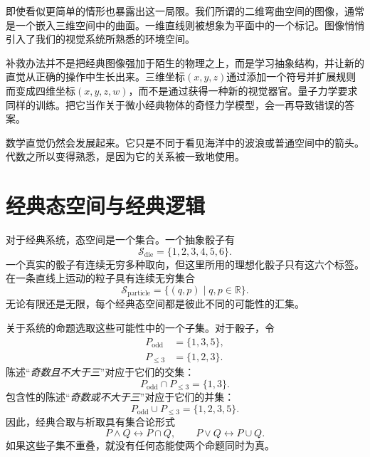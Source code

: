 即使看似更简单的情形也暴露出这一局限。我们所谓的二维弯曲空间的图像，通常是一个嵌入三维空间中的曲面。一维直线则被想象为平面中的一个标记。图像悄悄引入了我们的视觉系统所熟悉的环境空间。

补救办法并不是把经典图像强加于陌生的物理之上，而是学习抽象结构，并让新的直觉从正确的操作中生长出来。三维坐标\((x,y,z)\)通过添加一个符号并扩展规则而变成四维坐标\((x,y,z,w)\)，而不是通过获得一种新的视觉器官。量子力学要求同样的训练。把它当作关于微小经典物体的奇怪力学模型，会一再导致错误的答案。

\begin{remark}
数学直觉仍然会发展起来。它只是不同于看见海洋中的波浪或普通空间中的箭头。代数之所以变得熟悉，是因为它的关系被一致地使用。
\end{remark}

\section{经典态空间与经典逻辑}

对于经典系统，态空间是一个集合。一个抽象骰子有
\begin{equation}
  \mathcal S_{\mathrm{die}}=\{1,2,3,4,5,6\}.
\end{equation}
一个真实的骰子有连续无穷多种取向，但这里所用的理想化骰子只有这六个标签。在一条直线上运动的粒子具有连续无穷集合
\begin{equation}
  \mathcal S_{\mathrm{particle}}
  =
  \{(q,p)\mid q,p\in\mathbb R\}.
\end{equation}
无论有限还是无限，每个经典态空间都是彼此不同的可能性的汇集。

关于系统的命题选取这些可能性中的一个子集。对于骰子，令
\begin{align}
  P_{\mathrm{odd}}&=\{1,3,5\},\\
  P_{\leq 3}&=\{1,2,3\}.
\end{align}
陈述“\emph{奇数且不大于三}”对应于它们的交集：
\begin{equation}
  P_{\mathrm{odd}}\cap P_{\leq 3}=\{1,3\}.
\end{equation}
包含性的陈述“\emph{奇数或不大于三}”对应于它们的并集：
\begin{equation}
  P_{\mathrm{odd}}\cup P_{\leq 3}
  =
  \{1,2,3,5\}.
\end{equation}
因此，经典合取与析取具有集合论形式
\begin{equation}
  P\wedge Q\longleftrightarrow P\cap Q,
  \qquad
  P\vee Q\longleftrightarrow P\cup Q.
\end{equation}
如果这些子集不重叠，就没有任何态能使两个命题同时为真。

